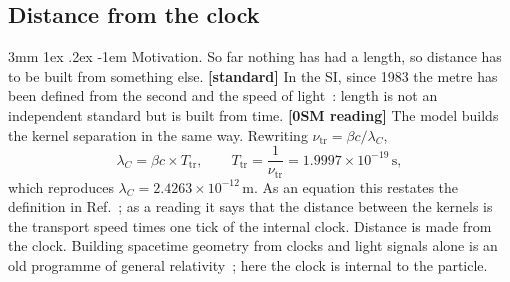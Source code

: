 \documentclass[%
 reprint, amsmath,amssymb, aps, prb, ]{revtex4-2}
\makeatletter
\numberwithin{equation}{section}
\renewcommand\paragraph{%
  \@startsection{paragraph}{4}{\z@}%
    {3mm \@plus 1ex \@minus .2ex}%
    {-1em}%
    {\normalfont\normalsize\itshape}}
\makeatother
\begin{document}
\subsection{Distance from the clock}

\paragraph{Motivation.} So far nothing has had a length, so distance has to be built from something else. \textbf{[standard]} In the SI, since 1983 the metre has been defined from the second and the speed of light~\cite{ref:si}: length is not an independent standard but is built from time. \textbf{[0SM reading]} The model builds the kernel separation in the same way. Rewriting $\nu_{\mathrm{tr}}=\beta c/\lambda_C$,
\begin{equation}
\lambda_C=\beta c\times T_{\mathrm{tr}},\qquad T_{\mathrm{tr}}=\frac{1}{\nu_{\mathrm{tr}}}=1.9997\times10^{-19}\,\mathrm{s},
\label{eq:distance}
\end{equation}
which reproduces $\lambda_C=2.4263\times10^{-12}\,\mathrm{m}$. As an equation this restates the definition in Ref.~\cite{ref:p10}; as a reading it says that the distance between the kernels is the transport speed times one tick of the internal clock. Distance is made from the clock. Building spacetime geometry from clocks and light signals alone is an old programme of general relativity~\cite{ref:marzke}; here the clock is internal to the particle.
\end{document}
